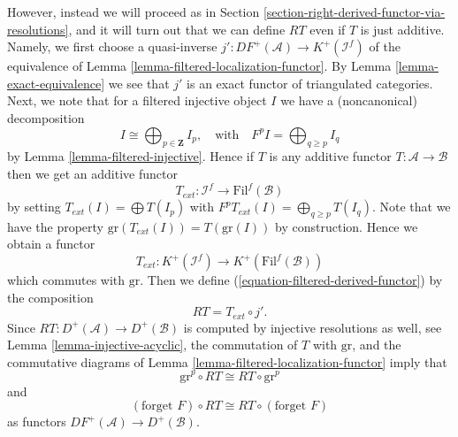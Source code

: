\medskip\noindent
However, instead we will proceed as in
Section \ref{section-right-derived-functor-via-resolutions},
and it will turn out that we can define $RT$ even if $T$ is just additive.
Namely, we first choose a quasi-inverse
$j' : DF^{+}(\mathcal{A}) \to K^{+}(\mathcal{I}^f)$ of the
equivalence of
Lemma \ref{lemma-filtered-localization-functor}.
By
Lemma \ref{lemma-exact-equivalence}
we see that $j'$ is an exact functor of triangulated categories.
Next, we note that for a filtered injective object $I$ we have
a (noncanonical) decomposition
\begin{equation}
\label{equation-decompose}
I \cong \bigoplus\nolimits_{p \in \mathbf{Z}} I_p,
\quad\text{with}\quad
F^pI = \bigoplus\nolimits_{q \geq p} I_q
\end{equation}
by
Lemma \ref{lemma-filtered-injective}.
Hence if $T$ is any additive functor $T : \mathcal{A} \to \mathcal{B}$
then we get an additive functor
\begin{equation}
\label{equation-extend-T}
T_{ext} : \mathcal{I}^f \to \text{Fil}^f(\mathcal{B})
\end{equation}
by setting $T_{ext}(I) = \bigoplus T(I_p)$ with
$F^pT_{ext}(I) = \bigoplus_{q \geq p} T(I_q)$. Note that we have the
property $\text{gr}(T_{ext}(I)) = T(\text{gr}(I))$ by construction.
Hence we obtain a functor
\begin{equation}
\label{equation-extend-T-complexes}
T_{ext} : K^{+}(\mathcal{I}^f) \to K^{+}(\text{Fil}^f(\mathcal{B}))
\end{equation}
which commutes with $\text{gr}$. Then we define
(\ref{equation-filtered-derived-functor}) by the composition
\begin{equation}
\label{equation-definition-filtered-derived-functor}
RT = T_{ext} \circ j'.
\end{equation}
Since $RT : D^{+}(\mathcal{A}) \to D^{+}(\mathcal{B})$ is computed
by injective resolutions as well, see
Lemma \ref{lemma-injective-acyclic},
the commutation of $T$ with $\text{gr}$, and the commutative diagrams of
Lemma \ref{lemma-filtered-localization-functor}
imply that
\begin{equation}
\label{equation-commute-gr}
\text{gr}^p \circ RT \cong RT \circ \text{gr}^p
\end{equation}
and
\begin{equation}
\label{equation-commute-forget}
(\text{forget }F) \circ RT \cong RT \circ (\text{forget }F)
\end{equation}
as functors $DF^{+}(\mathcal{A}) \to D^{+}(\mathcal{B})$.

